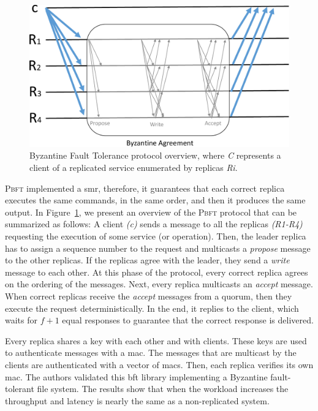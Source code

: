 \begin{figure}[h]
\begin{center}
\includegraphics[width=.7\columnwidth]{images/images/bft.pdf}
\caption{Byzantine Fault Tolerance protocol overview, where \emph{C} represents a client of a replicated service enumerated by replicas \emph{Ri}.}
\label{fig:bft}
\end{center}
\end{figure}

\textsc{Pbft} implemented a \gls{smr}, therefore, it guarantees that each correct replica executes the same commands, in the same order, and then it produces the same output. 
In Figure~\ref{fig:bft}, we present an overview of the \textsc{Pbft} protocol that can be summarized as follows:
A client \emph{(c)} sends a message to all the replicas \emph{(R1-R4)} requesting the execution of some service (or operation).
Then, the leader replica has to assign a sequence number to the request and multicasts a \emph{propose} message to the other replicas. 
If the replicas agree with the leader, they send a \emph{write} message to each other. 
At this phase of the protocol, every correct replica agrees on the ordering of the messages.  
Next, every replica multicasts an \emph{accept} message. 
When correct replicas receive the \emph{accept} messages from a quorum, then they execute the request deterministically. 
In the end, it replies to the client, which waits for $f+1$ equal responses to guarantee that the correct response is delivered.

Every replica shares a key with each other and with clients. 
These keys are used to authenticate messages with a \gls{mac}. 
The messages that are multicast by the clients are authenticated with a vector of \glspl{mac}. 
Then, each replica verifies its own \gls{mac}.
The authors validated this \gls{bft} library implementing a Byzantine fault-tolerant file system. 
The results show that when the workload increases the throughput and latency is nearly the same as a non-replicated system. 



